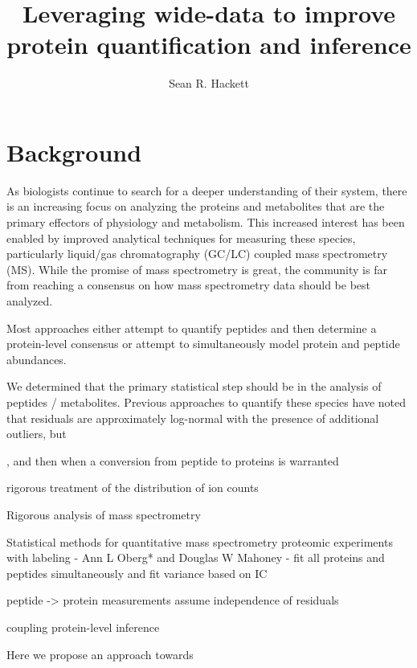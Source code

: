 \documentclass[12pt]{article}
\author{Sean R. Hackett}
\title{Leveraging wide-data to improve protein quantification and inference}
\date{}
\begin{document}
\setlength{\parskip}{1mm}
\linespread{1}

\thispagestyle{empty}
\pagestyle{empty}

\maketitle


\section{Background}

As biologists continue to search for a deeper understanding of their system, there is an increasing focus on analyzing the proteins and metabolites that are the primary effectors of physiology and metabolism. This increased interest has been enabled by improved analytical techniques for measuring these species, particularly liquid/gas chromatography (GC/LC) coupled mass spectrometry (MS). While the promise of mass spectrometry is great, the community is far from reaching a consensus on how mass spectrometry data should be best analyzed.

Most approaches either attempt to quantify peptides and then determine a protein-level consensus or attempt to simultaneously model protein and peptide abundances.


We determined that the primary statistical step should be in the analysis of peptides / metabolites. Previous approaches to quantify these species have noted that residuals are approximately log-normal with the presence of additional outliers, but 

, and then when a conversion from peptide to proteins is warranted 



rigorous treatment of the distribution of ion counts 



Rigorous analysis of mass spectrometry

Statistical methods for quantitative mass spectrometry proteomic experiments with labeling - Ann L Oberg* and Douglas W Mahoney - fit all proteins and peptides simultaneously and fit variance based on IC

peptide -> protein measurements assume independence of residuals

coupling protein-level inference

Here we propose an approach towards 
\end{document}
